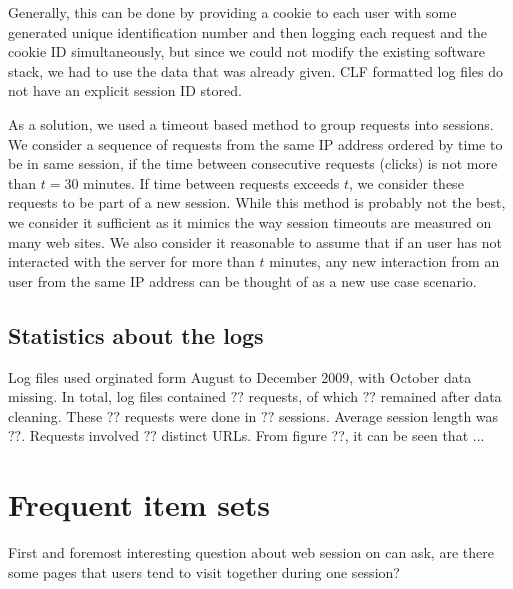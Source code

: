 \documentclass[english,a4paper]{article}
\begin{document}
Generally, this can be done by providing a cookie to each user with some generated unique identification number and then logging each request and the cookie ID simultaneously, but since we could not modify the existing software stack, we had to use the data that was already given. CLF formatted log files do not have an explicit session ID stored. 

As a solution, we used a timeout based method to group requests into sessions. We consider a sequence of requests from the same IP address ordered by time to be in
same session, if the time between consecutive requests (clicks) is not more
than $t = 30$ minutes. If time between requests exceeds $t$, we
consider these requests to be part of a new session. While this method is
probably not the best, we consider it sufficient as it mimics the way session
timeouts are measured on many web sites. We also consider it reasonable to
assume that if an user has not interacted with the server for more than $t$
minutes, any new interaction from an user from the same IP address can be
thought of as a new use case scenario.










\subsection{Statistics about the logs} 
Log files used orginated form August to December 2009, with October data missing. In total, log files contained 
$??$ requests, of which $??$ remained after data cleaning. These $??$ requests were done in $??$ sessions. Average session length was $??$. Requests involved $??$ distinct URLs. From figure ??, it can be seen that ...

















\section{Frequent item sets} 
First and foremost interesting question about web session on can ask, are there some pages that users tend to visit together during one session?
\end{document}

